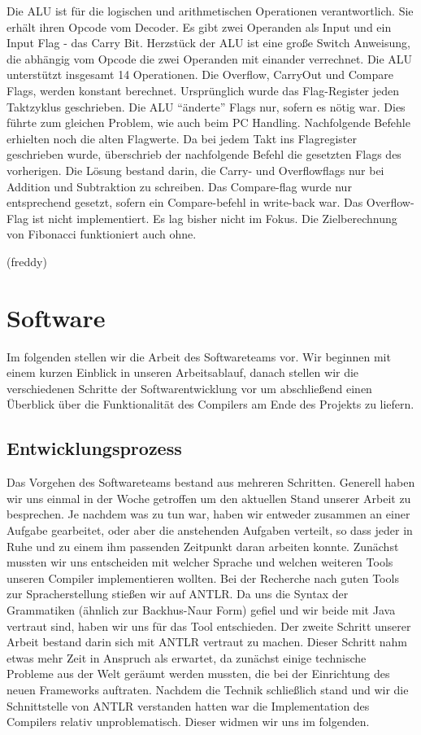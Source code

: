 \documentclass[paper=a4,fontsize=12pt,twocolumn]{scrreprt}
\begin{document}
Die ALU ist für die logischen und arithmetischen Operationen verantwortlich.
Sie erhält ihren Opcode vom Decoder.
Es gibt zwei Operanden als Input und ein Input Flag - das Carry Bit.
Herzstück der ALU ist eine große Switch Anweisung, die abhängig vom Opcode die zwei Operanden mit einander verrechnet.
Die ALU unterstützt insgesamt 14 Operationen.
Die Overflow, CarryOut und Compare Flags, werden konstant berechnet.
Ursprünglich wurde das Flag-Register jeden Taktzyklus geschrieben.
Die ALU \enquote{änderte} Flags nur, sofern es nötig war.
Dies führte zum gleichen Problem, wie auch beim PC Handling.
Nachfolgende Befehle erhielten noch die alten Flagwerte. 
Da bei jedem Takt ins Flagregister geschrieben wurde, überschrieb der nachfolgende Befehl die gesetzten Flags des vorherigen.
Die Lösung bestand darin, die Carry- und Overflowflags nur bei Addition und Subtraktion zu schreiben.
Das Compare-flag wurde nur entsprechend gesetzt, sofern ein Compare-befehl in write-back war.
Das Overflow-Flag ist nicht implementiert.
Es lag bisher nicht im Fokus.
Die Zielberechnung von Fibonacci funktioniert auch ohne.

(freddy)

\chapter{Software}
Im folgenden stellen wir die Arbeit des Softwareteams vor.
Wir beginnen mit einem kurzen Einblick in unseren Arbeitsablauf, danach stellen wir die verschiedenen Schritte der Softwarentwicklung vor um abschließend einen Überblick über die Funktionalität des Compilers am Ende des Projekts zu liefern.

\section{Entwicklungsprozess}
Das Vorgehen des Softwareteams bestand aus mehreren Schritten.
Generell haben wir uns einmal in der Woche getroffen um den aktuellen Stand unserer Arbeit zu besprechen.
Je nachdem was zu tun war, haben wir entweder zusammen an einer Aufgabe gearbeitet, oder aber die anstehenden Aufgaben verteilt, so dass jeder in Ruhe und zu einem ihm passenden Zeitpunkt daran arbeiten konnte.
Zunächst mussten wir uns entscheiden mit welcher Sprache und welchen weiteren Tools unseren Compiler implementieren wollten.
Bei der Recherche nach guten Tools zur Spracherstellung stießen wir auf ANTLR.
Da uns die Syntax der Grammatiken (ähnlich zur Backhus-Naur Form) gefiel und wir beide mit Java vertraut sind, haben wir uns für das Tool entschieden.
Der zweite Schritt unserer Arbeit bestand darin sich mit ANTLR vertraut zu machen.
Dieser Schritt nahm etwas mehr Zeit in Anspruch als erwartet, da zunächst einige technische Probleme aus der Welt geräumt werden mussten, die bei der Einrichtung des neuen Frameworks auftraten.
Nachdem die Technik schließlich stand und wir die Schnittstelle von ANTLR verstanden hatten war die Implementation des Compilers relativ unproblematisch. Dieser widmen wir uns im folgenden.
\end{document}
